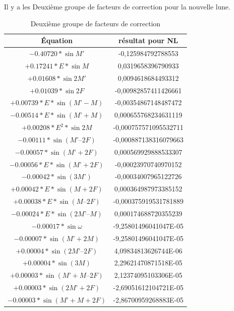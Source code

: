 Il y a les Deuxième groupe de facteurs de correction pour  la nouvelle lune.\\
\begin{table}[H]
	\caption{Deuxième groupe de facteurs de correction}
	\label{Deuxième groupe de facteurs de correction}
	\begin{center}
		\begin{tabular}{|c|c|}
		\hline 
		Équation & résultat pour NL \\ 
		\hline 
		$-0.40720 * \sin M' $ & -0,125984792788553\\
		\hline
		$+0.17241 * E  * \sin M $ & 0,0319658396790933\\
		\hline
		$+0.01608 * \sin 2M' $ & 0,0094618684493312\\
		\hline
		$+0.01039 * \sin 2F$ & -0,00982857411426661\\ 
		\hline
		$+0.00739 * E  * \sin (M’ - M)$ & -0,00354867148487472\\ 
		\hline
		$-0.00514 * E * \sin (M’ +M )$ & 0,000655768234631119\\ 
		\hline
		$+0.00208 * E^{2} * \sin 2M$ & -0,000757571095532711\\ 
		\hline
		$-0.00111* \sin (M’ – 2F)$ & -0,000887138316079663\\ 
		\hline
		$-0.00057 * \sin (M’ + 2F)$ & 0,000569929888533307\\ 
		\hline
		$-0.00056 *E * \sin (M’ + 2F)$ & -0,00023970740970152\\ 
		\hline
		$-0.00042 * \sin (3M’) $ & -0,00034007965122726\\ 
		\hline
		$+0.00042 * E  * \sin (M + 2F)$ & 0,000364987973385152\\ 
		\hline
		$+0.00038 * E  * \sin (M – 2F)$ & -0,000375919531781889\\ 
		\hline
		$-0.00024 * E   * \sin (2M’ – M )$ & 0,000174688720355239\\ 
		\hline
		$-0.00017  * \sin \omega $ & -9,25801496041047E-05\\ 
		\hline
		$-0.00007  * \sin (M’ + 2M)$ & -9,25801496041047E-05\\ 
		\hline
		$+0.00004 * \sin (2M’ – 2F)$ & 4,09834813626744E-06\\ 
		\hline
		$+0.00004  * \sin (3M)$ & 2,29621470871518E-05\\ 
		\hline
		$+0.00003 * \sin (M’ + M – 2F)$ & 2,12374095103306E-05\\ 
		\hline
		$+0.00003 * \sin (2M’ + 2 F )$ & -2,69051612104721E-05\\ 
		\hline
		$-0.00003   * \sin (M’ + M + 2F)$ & -2,86700959268883E-05\\ 

\end{tabular}
\end{center}
\end{table}

